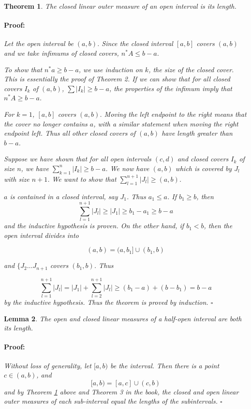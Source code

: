 \documentclass{article}
\newenvironment{proof}{\paragraph{Proof:}}{\hfill$\square$}
\newtheorem{theorem}{Theorem}
\newtheorem{lemma}[theorem]{Lemma}
\begin{document}
\begin{theorem}
\label{ClosedLinearMeasureOfOpenIntervalIsLength}
The closed linear outer measure of an open interval is its length.
\begin{proof}
Let the open interval be $(a, b)$. Since the closed interval $[a, b]$ covers $(a, b)$ and we take infimums of closed covers, $n^*A \leq b-a$.

To show that $n^*a \geq b-a$, we use induction on $k$, the size of the closed cover. This is essentially the proof of Theorem 2. If we can show that for all closed covers $I_k$ of $(a, b)$, $\sum |I_k| \geq b-a$, the properties of the infimum imply that $n^*A \geq b-a$.

For $k=1$, $[a, b]$ covers $(a, b)$. Moving the left endpoint to the right means that the cover no longer contains $a$, with a similar statement when moving the right endpoint left. Thus all other closed covers of $(a, b)$ have length greater than $b-a$.

Suppose we have shown that for all open intervals $(c, d)$ and closed covers $I_k$ of size $n$, we have $\sum_{k=1}^n |I_k| \geq b-a$. We now have $(a, b)$ which is covered by $J_l$ with size $n+1$. We want to show that $\sum_{l=1}^{n+1} |J_l| \geq (a, b)$.

$a$ is contained in a closed interval, say $J_1$. Thus $a_1 \leq a$. If $b_1 \geq b$, then
\[
\sum_{l=1}^{n+1} |J_l| \geq |J_1| \geq b_1 - a_1 \geq b - a
\]
and the inductive hypothesis is proven. On the other hand, if $b_1 < b$, then the open interval divides into

\[
(a, b) = (a, b_1] \cup (b_1, b)
\]

and $\{J_2 \dots J_{n+1}$ covers $(b_1, b)$. Thus

\[
\sum_{l=1}^{n+1} |J_l| = |J_1| + \sum_{l=2}^{n+1} |J_l| \geq (b_1 - a) + (b-b_1) = b-a
\]
by the inductive hypothesis. Thus the theorem is proved by induction.
\end{proof}
\end{theorem}

\begin{lemma}
The open and closed linear measures of a half-open interval are both its length.
\begin{proof}
Without loss of generality, let $[a, b)$ be the interval. Then there is a point $c \in (a, b)$, and 
\[
[a, b) = [a, c] \cup (c, b)
\]
and by Theorem \ref{ClosedLinearMeasureOfOpenIntervalIsLength} above and Theorem 3 in the book, the closed and open linear outer measures of each sub-interval equal the lengths of the subintervals.
\end{proof}
\end{lemma}
\end{document}

